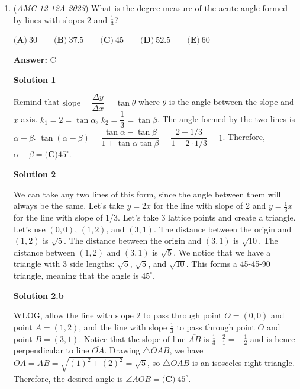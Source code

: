 \begin{enumerate}
Expanding the second equation gives
 \[y^2-2xy+x^2=4y^2 \implies x^2-2xy-3y^2=0.\]Using the first equation, replace $x^2$ with $y^3$:
 \[y^3-2xy-3y^2=0.\]Since $y>0$, divide by $y$ to get $y^2-2x-3y=0$, so $x$ is now linear in $y$:
 \[x=\frac{y^2-3y}{2}.\]Substituting this back into $x^2=y^3$:
 \[\frac{y^2(y-3)^2}{4}=y^3 \implies (y-3)^2=4y \implies y^2-10y+9=0 \implies (y-1)(y-9)=0.\]If $y=1$, then $x=\frac{1-3}{2}=-1$, which is not positive. So $y=9$ and $x=\frac{81-27}{2}=27$, giving $x+y=\boxed{\textbf{(D) }36}$.

 


	\item (\textit{AMC 12 12A 2023}) What is the degree measure of the acute angle formed by lines with slopes $2$ and $\frac{1}{3}$?


 $\textbf{(A)}~30\qquad\textbf{(B)}~37.5\qquad\textbf{(C)}~45\qquad\textbf{(D)}~52.5\qquad\textbf{(E)}~60$

 \textbf{Answer: }C



\textbf{Solution 1}

Remind that $\text{slope}=\dfrac{\Delta y}{\Delta x}=\tan \theta$ where $\theta$ is the angle between the slope and $x$-axis. $k_1=2=\tan \alpha$, $k_2=\dfrac{1}{3}=\tan \beta$. The angle formed by the two lines is $\alpha-\beta$. $\tan(\alpha-\beta)=\dfrac{\tan\alpha-\tan\beta}{1+\tan\alpha\tan\beta}=\dfrac{2-1/3}{1+2\cdot 1/3}=1$. Therefore, $\alpha-\beta=\boxed{\textbf{(C)} 45^\circ}$.

 



\textbf{Solution 2}

We can take any two lines of this form, since the angle between them will always be the same. Let's take $y=2x$ for the line with slope of 2 and $y=\frac{1}{3}x$ for the line with slope of 1/3. Let's take 3 lattice points and create a triangle. Let's use $(0,0)$, $(1,2)$, and $(3,1)$. The distance between the origin and $(1,2)$ is $\sqrt{5}$. The distance between the origin and $(3,1)$ is $\sqrt{10}$. The distance between $(1,2)$ and $(3,1)$ is $\sqrt{5}$. We notice that we have a triangle with 3 side lengths: $\sqrt{5}$, $\sqrt{5}$, and $\sqrt{10}$. This forms a 45-45-90 triangle, meaning that the angle is $\boxed{45^\circ}$.

 



\textbf{Solution 2.b}

WLOG, allow the line with slope $2$ to pass through point $O = (0, 0)$ and point $A = (1, 2)$, and the line with slope $\frac{1}{3}$ to pass through point $O$ and point $B = (3, 1)$. Notice that the slope of line $\overline{AB}$ is $\frac{1 - 2}{3 - 1} = -\frac{1}{2}$ and is hence perpendicular to line $\overline{OA}$. Drawing $\triangle OAB$, we have $\overline{OA} = \overline{AB} = \sqrt{(1)^2 + (2)^2} = \sqrt{5}$, so $\triangle OAB$ is an isosceles right triangle. Therefore, the desired angle is $\angle AOB = \boxed{\textbf{(C)}\ 45^\circ}.$





\end{enumerate}
